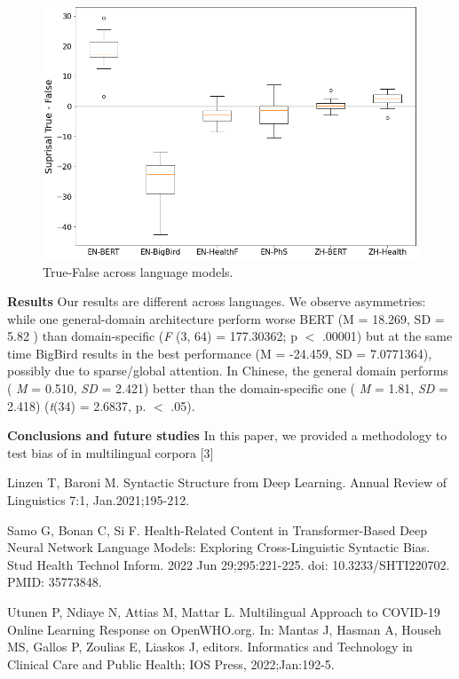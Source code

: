 \documentclass{IOS-Book-Article}
\begin{document}
\begin{figure}
    \centering
    \small
    \includegraphics[scale=0.35]{graphmatplot}
    \caption{True-False across language models. }
    \label{fig:my_label}
\end{figure}

\noindent \textbf{Results} Our results are different across languages. We observe asymmetries: while one general-domain architecture perform worse BERT (M = 18.269, SD = 5.82 ) than domain-specific (\textit{F} (3, 64) = 177.30362; p $<$ .00001) but at the same time BigBird results in the best performance (M = -24.459, SD = 7.0771364), possibly due to sparse/global attention. In Chinese, the general domain performs ( \textit{M} = 0.510, \textit{SD} = 2.421) better than the domain-specific one ( \textit{M} = 1.81, \textit{SD} = 2.418) (\textit{t}(34) = 2.6837, p. $<$ .05).

\noindent \textbf{Conclusions and future studies}
In this paper, we provided a methodology to test bias of in multilingual corpora [3]

\begin{thebibliography}{99}


Linzen T, Baroni M. Syntactic Structure from Deep Learning. Annual Review of Linguistics 7:1,
Jan.2021;195-212.

Samo G, Bonan C, Si F. Health-Related Content in Transformer-Based Deep Neural Network Language Models: Exploring Cross-Linguistic Syntactic Bias. Stud Health Technol Inform. 2022 Jun 29;295:221-225. doi: 10.3233/SHTI220702. PMID: 35773848.

Utunen P, Ndiaye N, Attias M, Mattar L. Multilingual Approach to COVID-19 Online Learning
Response on OpenWHO.org. In: Mantas J, Hasman A, Househ MS, Gallos P, Zoulias E, Liaskos J,
editors. Informatics and Technology in Clinical Care and Public Health; IOS Press, 2022;Jan:192-5.

\end{thebibliography}
\end{document}
